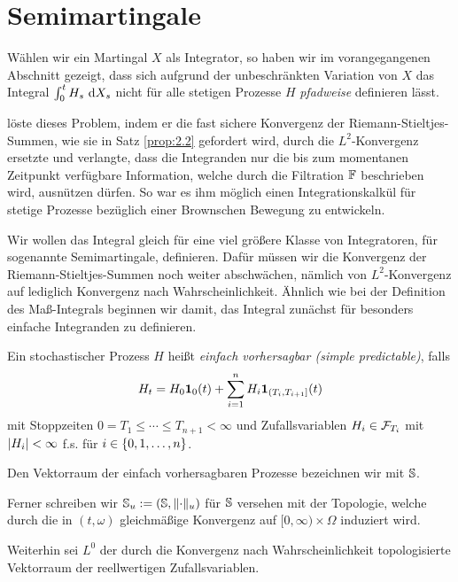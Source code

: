 \section{Semimartingale}

Wählen wir ein Martingal $X$ als Integrator, so haben wir im vorangegangenen
Abschnitt gezeigt, dass sich aufgrund der unbeschränkten Variation von $X$ das
Integral $\int_0^t H_s \,\dX_s$ nicht für alle stetigen Prozesse $H$
\textit{pfadweise} definieren lässt.

\Ito löste dieses Problem, indem er die fast sichere Konvergenz der
Riemann-Stieltjes-Summen, wie sie in Satz \ref{prop:2.2} gefordert wird, durch
die $L^2$-Konvergenz ersetzte und verlangte, dass die Integranden nur die bis
zum momentanen Zeitpunkt verfügbare Information, welche durch
die Filtration $\F$ beschrieben wird, ausnützen dürfen. So war es ihm möglich
einen Integrationskalkül für stetige Prozesse bezüglich einer Brownschen
Bewegung zu entwickeln.

Wir wollen das Integral gleich für eine viel größere Klasse von Integratoren,
für sogenannte Semimartingale, definieren. Dafür müssen wir die Konvergenz der
Riemann-Stieltjes-Summen noch weiter abschwächen, nämlich von $L^2$-Konvergenz
auf lediglich Konvergenz nach Wahrscheinlichkeit. Ähnlich wie bei der Definition
des Maß-Integrals beginnen wir damit, das Integral zunächst für besonders
einfache Integranden zu definieren.


\begin{defn}
\label{defn:2.8}
Ein stochastischer Prozess $H$ heißt \emph{einfach vorhersagbar (simple
predictable)}, falls
\begin{align*}
H_t =H_0 \Id_{{0}}(t) + \sum_{i=1}^n H_i \Id_{(T_i,T_{i+1}]}(t)
\end{align*}
mit Stoppzeiten $0=T_1 \le \cdots \le T_{n+1} < \infty$ und
Zufallsvariablen $H_i\in \FF_{T_i}$ mit $\abs{H_i} < \infty$ f.s. für $i\in
\setd{0,1,\ldots,n}$. \fish
\end{defn}

\begin{rem*}[Bezeichnungen.]
\begin{remenum}
\item Den Vektorraum der einfach vorhersagbaren Prozesse bezeichnen wir mit $\S$.
\item Ferner schreiben wir $\S_u \defl (\S,\norm{\cdot}_u)$ für $\S$
versehen mit der Topologie, welche durch die in $(t,\omega)$ gleichmäßige
Konvergenz auf $[0,\infty)\times \Omega$ induziert wird.
\item Weiterhin sei $L^0$ der durch die Konvergenz nach Wahrscheinlichkeit
topologisierte Vektorraum der reellwertigen Zufallsvariablen.\map
\end{remenum}
\end{rem*}

